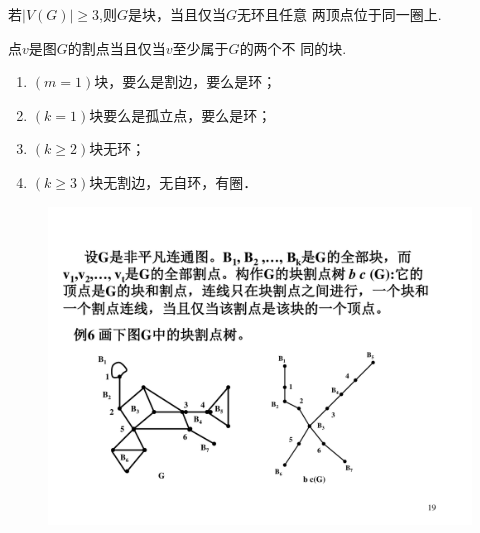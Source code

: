 \begin{theorem}
	若$|V(G)|\geq 3$,则$G$是块，当且仅当$G$无环且任意
	两顶点位于同一圈上.
\end{theorem}

\begin{theorem}
	点$v$是图$G$的割点当且仅当$v$至少属于$G$的两个不
	同的块.
\end{theorem}
\begin{note}
	\begin{enumerate}
		\item $(m=1)$块，要么是割边，要么是环；
		\item $(k = 1)$块要么是孤立点，要么是环；
		\item $(k\geq 2)$块无环；
		\item $(k\geq 3)$块无割边，无自环，有圈．
	\end{enumerate}
\end{note}



\noindent {\bfseries \textcolor{ecolor}{块割点树：}}

\begin{figure}[H]
	\small
	\centering 
	\includegraphics[scale=0.42]{image/CH3_kuai.pdf}  
	\label{figk1ik}  
\end{figure}

